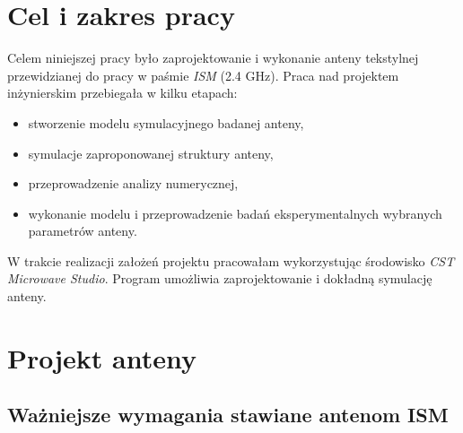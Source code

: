 \chapter{Cel i zakres pracy}

Celem niniejszej pracy było zaprojektowanie i wykonanie anteny tekstylnej przewidzianej do pracy w paśmie \emph{ISM} (2.4 GHz). 
Praca nad projektem inżynierskim przebiegała w kilku etapach:

\begin{itemize}\setlength{\itemsep}{0pt}
	
	\item stworzenie modelu symulacyjnego badanej anteny,

	\item symulacje zaproponowanej struktury anteny,

	\item przeprowadzenie analizy numerycznej,

	\item wykonanie modelu i przeprowadzenie badań eksperymentalnych wybranych parametrów anteny.

\end{itemize}

W trakcie realizacji założeń projektu pracowałam wykorzystując środowisko \emph{CST Microwave Studio}. Program umożliwia zaprojektowanie i dokładną symulację anteny.   





\chapter {Projekt anteny}

\section{Ważniejsze wymagania stawiane antenom ISM}










	